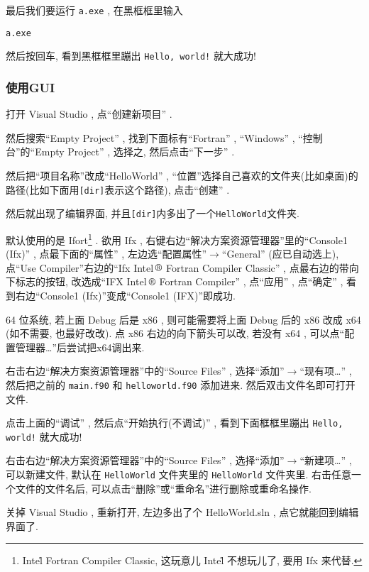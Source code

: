 最后我们要运行 \texttt{a.exe} , 在黑框框里输入
\begin{verbatim}
a.exe
\end{verbatim}
然后按回车, 看到黑框框里蹦出 \texttt{Hello, world!} 就大成功!

\subsubsection{使用GUI}

打开 Visual Studio , 点``创建新项目'' .

然后搜索``Empty Project'' , 找到下面标有``Fortran'' , ``Windows'' , ``控制台''的``Empty Project'' , 选择之, 然后点击``下一步'' .

然后把``项目名称''改成``HelloWorld'' , ``位置''选择自己喜欢的文件夹(比如桌面)的路径(比如下面用\texttt{[dir]}表示这个路径), 点击``创建'' .

然后就出现了编辑界面, 并且\texttt{[dir]}内多出了一个\texttt{HelloWorld}文件夹.

默认使用的是 Ifort\footnote{Intel\r{} Fortran Compiler Classic, 这玩意儿 Intel\r{} 不想玩儿了, 要用 Ifx 来代替.} . 欲用 Ifx , 右键右边``解决方案资源管理器''里的``Console1 (Ifx)'' , 点最下面的``属性'' , 左边选``配置属性''$\rightarrow$``General'' (应已自动选上), 点``Use Compiler''右边的``Ifx Intel$\,\text{\textregistered}$ Fortran Compiler Classic'' , 点最右边的带向下标志的按钮, 改选成``IFX Intel$\,\text{\textregistered}$ Fortran Compiler'' , 点``应用'' , 点``确定'' , 看到右边``Console1 (Ifx)''变成``Console1 (IFX)''即成功.

64 位系统, 若上面 Debug 后是 x86 , 则可能需要将上面 Debug 后的 x86 改成 x64 (如不需要, 也最好改改). 点 x86 右边的向下箭头可以改, 若没有 x64 , 可以点``配置管理器\dots''后尝试把x64调出来.

右击右边``解决方案资源管理器''中的``Source Files'' , 选择``添加''$\rightarrow$``现有项\dots'' , 然后把之前的 \texttt{main.f90} 和 \texttt{helloworld.f90} 添加进来. 然后双击文件名即可打开文件.

点击上面的``调试'' , 然后点``开始执行(不调试)'' , 看到下面框框里蹦出 \texttt{Hello, world!} 就大成功!

右击右边``解决方案资源管理器''中的``Source Files'' , 选择``添加''$\rightarrow$``新建项\dots'' , 可以新建文件, 默认在 \texttt{HelloWorld} 文件夹里的 \texttt{HelloWorld} 文件夹里. 右击任意一个文件的文件名后, 可以点击``删除''或``重命名''进行删除或重命名操作.

关掉 Visual Studio , 重新打开, 左边多出了个 HelloWorld.sln , 点它就能回到编辑界面了.

